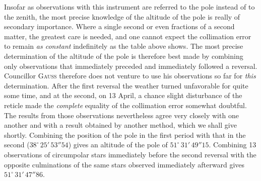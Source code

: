 \par\indent Insofar as observations with this instrument are referred to the pole instead of to the zenith, the most precise knowledge of the altitude of the pole is really of secondary importance. Where a single second or even fractions of a second matter, the greatest care is needed, and one cannot expect the collimation error to remain \textit{as constant} indefinitely as the table above shows. The most precise determination of the altitude of the pole is therefore best made by combining only observations that immediately preceded and immediately followed a reversal. Councillor \textsc{Gauss} therefore does not venture to use his observations so far for \textit{this} determination. After the first reversal the weather turned unfavorable for quite some time, and at the second, on 13 April, a chance slight disturbance of the reticle made the \textit{complete} equality of the collimation error somewhat doubtful. The results from those observations nevertheless agree very closely with one another and with a result obtained by another method, which we shall give shortly. Combining the position of the pole in the first period with that in the second ($38^\circ\,25'\,53''\!54$) gives an altitude of the pole of $51^\circ\,31'\,49''\!15$. Combining 13 observations of circumpolar stars immediately before the second reversal with the opposite culminations of the same stars observed immediately afterward gives $51^\circ\,31'\,47''\!86$.

